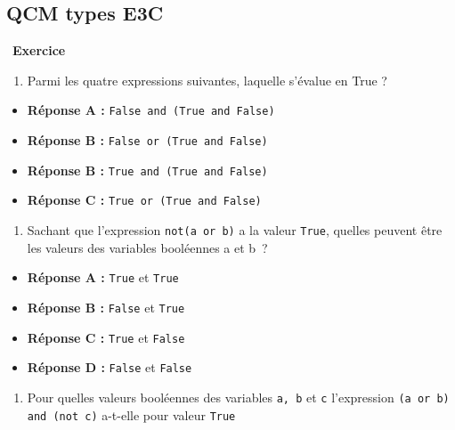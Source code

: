 \documentclass[
  11pt,
]{article}
\newcommand{\passthrough}[1]{#1}
\providecommand{\tightlist}{%
  \setlength{\itemsep}{0pt}\setlength{\parskip}{0pt}}
\newcounter{exo}
\newenvironment{exercice}[1]
{\par \medskip   \addtocounter{exo}{1} \noindent  
\begin{bclogo}[arrondi =0.1,   noborder = true, logo=\bccrayon, marge=4]{~\textbf{Exercice} \textbf{\theexo} {\itshape #1} }  \par}
{
\end{bclogo}
 \par \bigskip }
\newcounter{def}
\begin{document}
\hypertarget{qcm-types-e3c}{%
\subsection{QCM types E3C}\label{qcm-types-e3c}}

\begin{exercice}{}

\begin{enumerate}
\def\labelenumi{\arabic{enumi}.}
\tightlist
\item
  Parmi les quatre expressions suivantes, laquelle s'évalue en True ?
\end{enumerate}

\begin{itemize}
\item
  \textbf{Réponse A :}
  \passthrough{\lstinline!False and (True and False)!}
\item
  \textbf{Réponse B :}
  \passthrough{\lstinline!False or (True and False)!}
\item
  \textbf{Réponse B :}
  \passthrough{\lstinline!True and (True and False)!}
\item
  \textbf{Réponse C :}
  \passthrough{\lstinline!True or (True and False)!}
\end{itemize}

\begin{enumerate}
\def\labelenumi{\arabic{enumi}.}
\setcounter{enumi}{1}
\tightlist
\item
  Sachant que l'expression \passthrough{\lstinline!not(a or b)!} a la
  valeur \passthrough{\lstinline!True!}, quelles peuvent être les
  valeurs des variables booléennes a et b~?
\end{enumerate}

\begin{itemize}
\tightlist
\item
  \textbf{Réponse A :} \passthrough{\lstinline!True!} et
  \passthrough{\lstinline!True!}
\item
  \textbf{Réponse B :} \passthrough{\lstinline!False!} et
  \passthrough{\lstinline!True!}
\item
  \textbf{Réponse C :} \passthrough{\lstinline!True!} et
  \passthrough{\lstinline!False!}
\item
  \textbf{Réponse D :} \passthrough{\lstinline!False!} et
  \passthrough{\lstinline!False!}
\end{itemize}

\begin{enumerate}
\def\labelenumi{\arabic{enumi}.}
\setcounter{enumi}{2}
\tightlist
\item
  Pour quelles valeurs booléennes des variables
  \passthrough{\lstinline!a, b!} et \passthrough{\lstinline!c!}
  l'expression \passthrough{\lstinline!(a or b) and (not c)!} a-t-elle
  pour valeur \passthrough{\lstinline!True!}
\end{enumerate}


\end{exercice}
\end{document}
